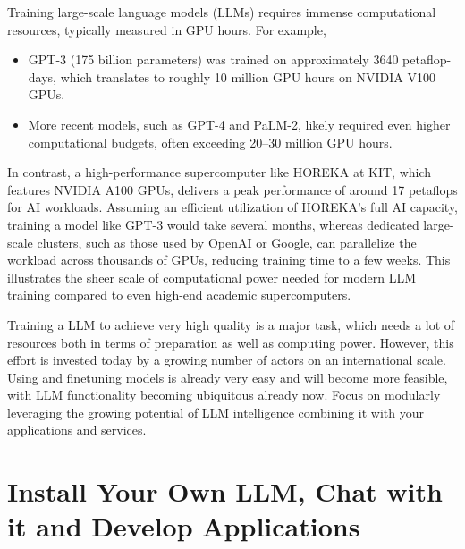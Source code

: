 Training large-scale language models (LLMs) requires immense computational resources, typically measured in GPU hours. For example, 
\begin{itemize}
\item
GPT-3 (175 billion parameters) was trained on approximately 3640 petaflop-days, which translates to roughly 10 million GPU hours on NVIDIA V100 GPUs. 
\item
More recent models, such as GPT-4 and PaLM-2, likely required even higher computational budgets, often exceeding 20–30 million GPU hours. 
\end{itemize}
In contrast, a high-performance supercomputer like HOREKA at KIT, which features NVIDIA A100 GPUs, delivers a peak performance of around 17 petaflops for AI workloads. Assuming an efficient utilization of HOREKA’s full AI capacity, training a model like GPT-3 would take several months, whereas dedicated large-scale clusters, such as those used by OpenAI or Google, can parallelize the workload across thousands of GPUs, reducing training time to a few weeks. This illustrates the sheer scale of computational power needed for modern LLM training compared to even high-end academic supercomputers.

\begin{recommendationbox}
Training a LLM to achieve very high quality is a major task, which needs a lot of resources both in terms of preparation as well as computing power. However, this effort is invested today by a growing number of actors on an international scale. Using and finetuning models is already very easy and will become more feasible, with LLM functionality becoming ubiquitous already now. Focus on modularly leveraging the growing potential of LLM intelligence combining it with your applications and services. 
\end{recommendationbox}


%
\section{Install Your Own LLM, Chat with it and Develop Applications}

